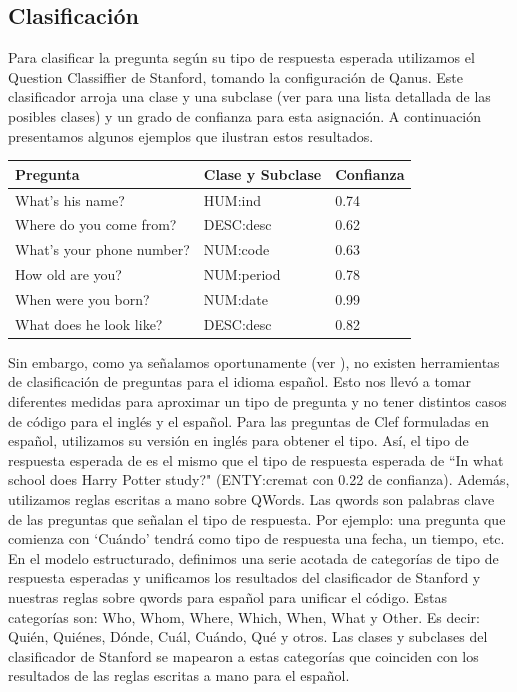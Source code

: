 \subsection{Clasificación}
\label{subsec:qtype}
Para clasificar la pregunta según su tipo de respuesta esperada utilizamos el Question Classiffier de Stanford, tomando la configuración de Qanus. Este clasificador arroja una clase y una subclase (ver  para una lista detallada de las posibles clases) y un grado de confianza para esta asignación. A continuación presentamos algunos ejemplos que ilustran estos resultados.

\begin{center}
\begin{tabular}{| l | l | l |}
\hline
Pregunta & Clase y Subclase & Confianza\\ \hline 
What's his name? & HUM:ind & 0.74 \\ \hline 
Where do you come from? & DESC:desc & 0.62 \\ \hline 
What's your phone number? & NUM:code & 0.63 \\ \hline 
How old are you? & NUM:period & 0.78 \\ \hline 
When were you born? & NUM:date & 0.99 \\ \hline 
What does he look like? & DESC:desc & 0.82 \\ \hline 
\end{tabular}
\end{center}

Sin embargo, como ya señalamos oportunamente (ver ), no existen herramientas de clasificación de preguntas para el idioma español. Esto nos llevó a tomar diferentes medidas para aproximar un tipo de pregunta y no tener distintos casos de código para el inglés y el español. Para las preguntas de Clef formuladas en español, utilizamos su versión en inglés para obtener el tipo.
Así, el tipo de respuesta esperada de  es el mismo que el tipo de respuesta esperada de ``In what school does Harry Potter study?" (ENTY:cremat con 0.22 de confianza). Además, utilizamos reglas escritas a mano sobre QWords. Las qwords son palabras clave de las preguntas que señalan el tipo de respuesta. Por ejemplo: una pregunta que comienza con `Cuándo' tendrá como tipo de respuesta una fecha, un tiempo, etc. En el modelo estructurado, definimos una serie acotada de categorías de tipo de respuesta esperadas y unificamos los resultados del clasificador de Stanford y nuestras reglas sobre qwords para español para unificar el código. Estas categorías son:  Who, Whom, Where, Which,  When,  What y Other. Es decir: Quién, Quiénes, Dónde, Cuál, Cuándo, Qué y otros. Las clases y subclases del clasificador de Stanford se mapearon a estas categorías que coinciden con los resultados de las reglas escritas a mano para el español. 



